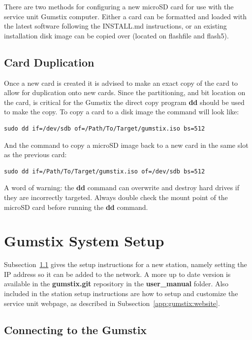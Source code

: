 There are two methods for configuring a new microSD card for use with the service unit Gumstix computer.
Either a card can be formatted and loaded with the latest software following the INSTALL.md instructions, or an existing installation disk image can be copied over (located on flashfile and flash5).

\subsection{Card Duplication}
\label{app:gumstix:duplication}

Once a new card is created it is advised to make an exact copy of the card to allow for duplication onto new cards.
Since the partitioning, and bit location on the card, is critical for the Gumstix the direct copy program {\bf dd} should be used to make the copy.
To copy a card to a disk image the command will look like:

\begin{verbatim}
sudo dd if=/dev/sdb of=/Path/To/Target/gumstix.iso bs=512
\end{verbatim}

And the command to copy a microSD image back to a new card in the same slot as the previous card:

\begin{verbatim}
sudo dd if=/Path/To/Target/gumstix.iso of=/dev/sdb bs=512
\end{verbatim}

A word of warning: the {\bf dd} command can overwrite and destroy hard drives if they are incorrectly targeted.
Always double check the mount point of the microSD card before running the {\bf dd} command.

\section{Gumstix System Setup}

Subsection~\ref{app:appendix:setup} gives the setup instructions for a new station, namely setting the IP address so it can be added to the network.
A more up to date version is available in the {\bf gumstix.git} repository in the {\bf user\_manual} folder.
Also included in the station setup instructions are how to setup and customize the service unit webpage, as described in Subsection~\ref{app:gumstix:website}.

\subsection{Connecting to the Gumstix}
\label{app:appendix:setup}

